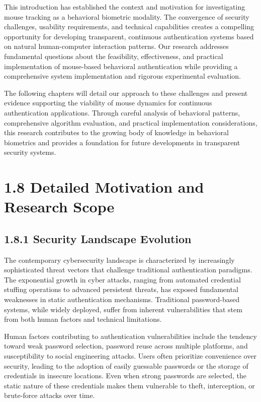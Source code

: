 \documentclass[
  12pt,
  a4paper,
]{report}
\begin{document}
This introduction has established the context and motivation for
investigating mouse tracking as a behavioral biometric modality. The
convergence of security challenges, usability requirements, and
technical capabilities creates a compelling opportunity for developing
transparent, continuous authentication systems based on natural
human-computer interaction patterns. Our research addresses fundamental
questions about the feasibility, effectiveness, and practical
implementation of mouse-based behavioral authentication while providing
a comprehensive system implementation and rigorous experimental
evaluation.

The following chapters will detail our approach to these challenges and
present evidence supporting the viability of mouse dynamics for
continuous authentication applications. Through careful analysis of
behavioral patterns, comprehensive algorithm evaluation, and practical
implementation considerations, this research contributes to the growing
body of knowledge in behavioral biometrics and provides a foundation for
future developments in transparent security systems.

\newpage

\section{1.8 Detailed Motivation and Research
Scope}\label{detailed-motivation-and-research-scope}

\subsection{1.8.1 Security Landscape
Evolution}\label{security-landscape-evolution}

The contemporary cybersecurity landscape is characterized by
increasingly sophisticated threat vectors that challenge traditional
authentication paradigms. The exponential growth in cyber attacks,
ranging from automated credential stuffing operations to advanced
persistent threats, has exposed fundamental weaknesses in static
authentication mechanisms. Traditional password-based systems, while
widely deployed, suffer from inherent vulnerabilities that stem from
both human factors and technical limitations.

Human factors contributing to authentication vulnerabilities include the
tendency toward weak password selection, password reuse across multiple
platforms, and susceptibility to social engineering attacks. Users often
prioritize convenience over security, leading to the adoption of easily
guessable passwords or the storage of credentials in insecure locations.
Even when strong passwords are selected, the static nature of these
credentials makes them vulnerable to theft, interception, or brute-force
attacks over time.
\end{document}
